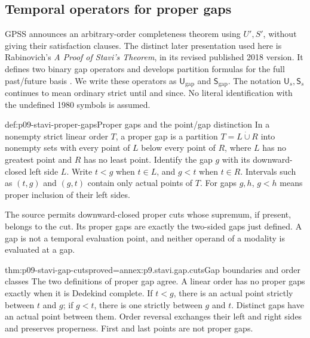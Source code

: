 
\subsection{Temporal operators for proper gaps}
\label{sec:p09-stavi-gap-temporal-logic}

GPSS announces an arbitrary-order completeness theorem using
\(U',S'\), without giving their satisfaction clauses.
The distinct later presentation used here is Rabinovich's
\emph{A Proof of Stavi's Theorem}, in its revised published
2018 version. It defines two binary gap operators and
develops partition formulas for the full past/future
basis \cite[secs.~2--5]{Rabinovich2018Stavi}.
We write these operators as \(\mathsf U_{\mathrm{gap}}\)
and \(\mathsf S_{\mathrm{gap}}\). The notation
\(\mathsf U_s,\mathsf S_s\) continues to mean ordinary
strict until and since. No literal identification with
the undefined 1980 symbols is assumed.

\begin{hbdefinition}{def:p09-stavi-proper-gaps}{Proper gaps and the point/gap distinction}
In a nonempty strict linear order \(T\), a proper gap
is a partition \(T=L\mathbin{\dot\cup}R\) into
nonempty sets with every point of \(L\) below every
point of \(R\), where \(L\) has no greatest point
and \(R\) has no least point. Identify the gap
\(g\) with its downward-closed left side \(L\).
Write \(t<g\) when \(t\in L\), and \(g<t\)
when \(t\in R\). Intervals such as \((t,g)\)
and \((g,t)\) contain only actual points of \(T\).
For gaps \(g,h\), \(g<h\) means proper inclusion
of their left sides.

The source permits downward-closed proper cuts
whose supremum, if present, belongs to the cut.
Its proper gaps are exactly the two-sided gaps
just defined. A gap is not a temporal evaluation
point, and neither operand of a modality is
evaluated at a gap.
\end{hbdefinition}

\begin{hblemma}{thm:p09-stavi-gap-cuts}{proved=annex:p9.stavi.gap.cuts}{Gap boundaries and order classes}
The two definitions of proper gap agree.
A linear order has no proper gaps exactly
when it is Dedekind complete. If \(t<g\),
there is an actual point strictly between
\(t\) and \(g\); if \(g<t\), there is one
strictly between \(g\) and \(t\).
Distinct gaps have an actual point between
them. Order reversal exchanges their left
and right sides and preserves properness.
First and last points are not proper gaps.
\end{hblemma}


